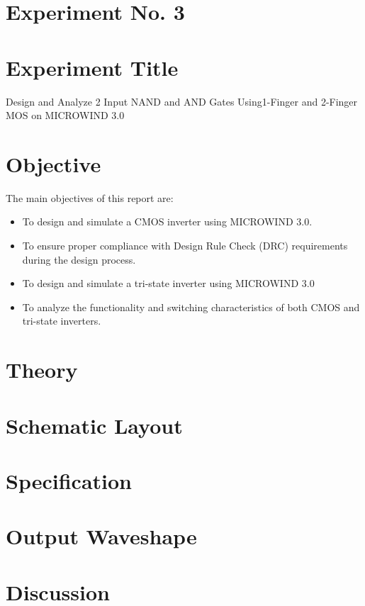 \documentclass[a4paper,12pt]{article}
\begin{document}
	\section{Experiment No. 3}
	
	
	\section{Experiment Title }
	Design and Analyze 2 Input NAND and AND Gates Using1-Finger and 2-Finger MOS on
	MICROWIND 3.0
	\section{Objective}
	The main objectives of this report are:
	\begin{itemize}
		\item To design and simulate a CMOS inverter using MICROWIND 3.0.
		\item To ensure proper compliance with Design Rule Check (DRC) requirements during the design process.
		\item To design and simulate a tri-state inverter using MICROWIND 3.0
		\item To analyze the functionality and switching characteristics of both CMOS and tri-state inverters.
	\end{itemize}
	\section{Theory}
	\section{Schematic Layout }
	\section{Specification}
	\section{Output Waveshape }
	\section{Discussion }
	
\end{document}
